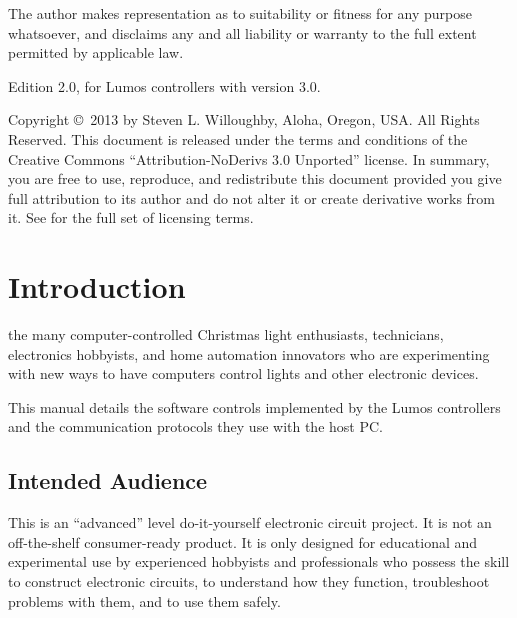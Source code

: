 \documentclass[letterpaper,twoside,onecolumn,openright,final]{memoir}
\begin{document}
The author makes  representation as to suitability or fitness for any purpose whatsoever, and disclaims any and all liability or warranty to the full extent permitted by applicable law.

\strut\vfill
\noindent Edition 2.0, for Lumos controllers with  version 3.0.

\smallskip


\noindent Copyright \copyright\ 2013 by Steven L. Willoughby,
Aloha, Oregon, USA.  All Rights Reserved.  
This document is released under the terms and conditions of the 
Creative Commons ``Attribution-NoDerivs 3.0 Unported'' license.  
In summary, you are free to use, reproduce, and redistribute this 
document provided you give full attribution to its author and do not
alter it or create derivative works from it.  See
 for the full
set of licensing terms.

\begin{center}
\end{center}

\newpage
\tableofcontents

\mainmatter

\chapter{Introduction}
 the many computer-controlled
Christmas light enthusiasts,  technicians, electronics hobbyists,
and home automation innovators who are experimenting with new ways to have computers
control lights and other electronic devices.

This manual details the software controls implemented by the Lumos controllers
and the communication protocols they use with the host PC.

\section{Intended Audience}
This is an ``advanced'' level do-it-yourself electronic circuit project.  It is not
an off-the-shelf consumer-ready product.  It is only designed for educational and experimental
use by experienced hobbyists and professionals who possess the skill to construct electronic
circuits, to understand how they function, troubleshoot problems with them, and to use them safely.
\end{document}
